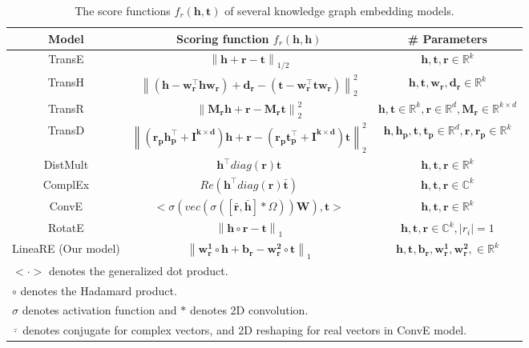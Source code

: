 \documentclass[conference]{IEEEtran}
\begin{document}
\begin{table*}[t]
	\caption{
		The score functions $f_r(\bm{h},\bm{t})$ of several knowledge graph embedding models.
	}
	\label{ScoringFunction}
	\centering
	\begin{tabular}{|c|c|c|}  
		\hline
		\textbf{Model}
		& \textbf{Scoring function $f_r(\bm{h}, \bm{h})$}
		& \textbf{\# Parameters} \\
		\hline
		TransE \cite{TransE}
		& $\left \| \bm{h} + \bm{r} - \bm{t} \right \|_{1/2}$
		& $\bm{h}, \bm{t}, \bm{r} \in \mathbb{R}^{k}$ \\
		\hline
		TransH \cite{TransH}
		& $\left \| (\bm{h} - \bm{w_{r}^{\top}hw_{r}}) + \bm{d_r}-(\bm{t} - \bm{w_{r}^{\top}tw_{r}}) \right \|_{2}^{2}$
		& $\bm{h}, \bm{t}, \bm{w_r}, \bm{d_r} \in \mathbb{R}^{k}$ \\
		\hline
		TransR \cite{TransR}
		& $\left \| \bm{M_rh} + \bm{r} - \bm{M_rt} \right \|_{2}^{2}$
		& $\bm{h}, \bm{t} \in \mathbb{R}^{k}, \bm{r} \in \mathbb{R}^{d}, \bm{M_r} \in \mathbb{R}^{k \times d}$ \\
		\hline
		TransD \cite{TransD}
		& $\left \| (\bm{r_p h_p^{\top}} + \bm{I^{k \times d}})\bm{h} + \bm{r} - (\bm{r_p t_p^{\top}} + \bm{I^{k \times d}})\bm{t} \right \|_{2}^{2}$
		& $\bm{h}, \bm{h_p}, \bm{t}, \bm{t_p} \in \mathbb{R}^{d}, \bm{r}, \bm{r_p} \in \mathbb{R}^{k}$ \\
		\hline
		DistMult \cite{DistMult}
		& $\bm{h^{\top}}diag(\bm{r})\bm{t}$
		& $\bm{h}, \bm{t}, \bm{r} \in \mathbb{R}^{k}$ \\
		\hline
		ComplEx \cite{ComplEx}
		& $Re(\bm{h^{\top}}diag(\bm{r})\bm{\bar{t}})$
		& $\bm{h}, \bm{t}, \bm{r} \in \mathbb{C}^{k}$ \\
		\hline
		ConvE \cite{ConvE}
		& $<\sigma(vec(\sigma([\bar{\bm{r}}, \bar{\bm{h}}] * \varOmega)) \bm{W}), \bm{t}>$
		& $\bm{h}, \bm{t}, \bm{r} \in \mathbb{R}^{k}$ \\
		\hline
		RotatE \cite{RotatE}
		& $\left \| \bm{h} \circ \bm{r} - \bm{t} \right \|_{1}$
		& $\bm{h}, \bm{t}, \bm{r} \in \mathbb{C}^{k}, |r_i|=1$ \\
		\hline
		LineaRE (Our model)
		& $\left \| \bm{w_{r}^{1}} \circ \bm{h} + \bm{b_r} - \bm{w_{r}^{2}} \circ \bm{t} \right \|_{1}$
		& $\bm{h}, \bm{t}, \bm{b_r}, \bm{w_{r}^{1}}, \bm{w_{r}^{2}}, \in \mathbb{R}^{k}$ \\
		\hline
		\multicolumn{3}{l}{$<\cdot>$ denotes the generalized dot product.} \\
		\multicolumn{3}{l}{$\circ$ denotes the Hadamard product.} \\
		\multicolumn{3}{l}{$\sigma$ denotes activation function and $*$ denotes 2D convolution.} \\
		\multicolumn{3}{l}{$\bar{\cdot}$ denotes conjugate for complex vectors, and 2D reshaping for real vectors in ConvE model.}
	\end{tabular}
\end{table*}
\end{document}
